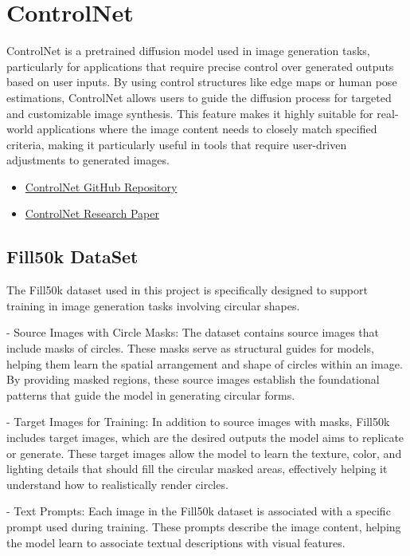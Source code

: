 \documentclass[12pt,a4paper]{report}
\begin{document}
\section*{ControlNet}
ControlNet is a pretrained diffusion model used in image generation tasks, particularly for applications that require precise control over generated outputs based on user inputs. By using control structures like edge maps or human pose estimations, ControlNet allows users to guide the diffusion process for targeted and customizable image synthesis. This feature makes it highly suitable for real-world applications where the image content needs to closely match specified criteria, making it particularly useful in tools that require user-driven adjustments to generated images.
\begin{itemize}
    \item \href{https://github.com/lllyasviel/ControlNet}{ControlNet GitHub Repository}
    \item \href{https://arxiv.org/pdf/2302.05543}{ControlNet Research Paper}
\end{itemize}

\subsection*{Fill50k DataSet}

The Fill50k dataset used in this project is specifically designed to support training in image generation tasks involving circular shapes.

- Source Images with Circle Masks: The dataset contains source images that include masks of circles. These masks serve as structural guides for models, helping them learn the spatial arrangement and shape of circles within an image. By providing masked regions, these source images establish the foundational patterns that guide the model in generating circular forms.

- Target Images for Training: In addition to source images with masks, Fill50k includes target images, which are the desired outputs the model aims to replicate or generate. These target images allow the model to learn the texture, color, and lighting details that should fill the circular masked areas, effectively helping it understand how to realistically render circles.

- Text Prompts: Each image in the Fill50k dataset is associated with a specific prompt used during training. These prompts describe the image content, helping the model learn to associate textual descriptions with visual features.
\end{document}
